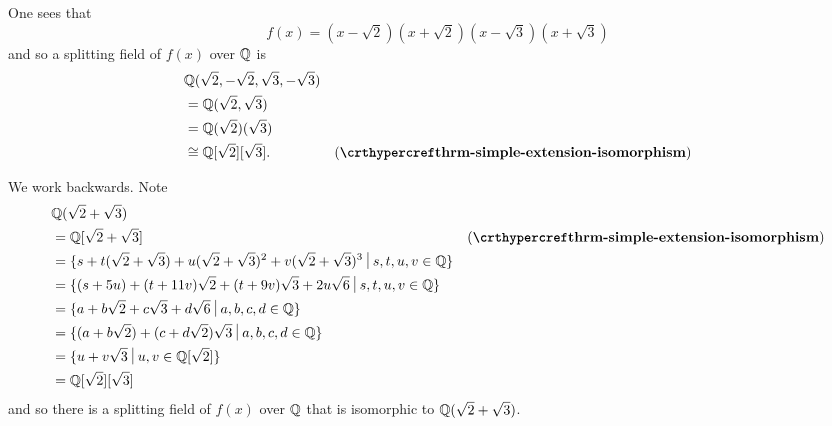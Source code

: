 \begin{questions}
    \item \begin{partquestions}{\roman*}
        \item One sees that
        \[
            f(x) = (x-\sqrt2)(x+\sqrt2)(x-\sqrt3)(x+\sqrt3)
        \]
        and so a splitting field of $f(x)$ over $\mathbb{Q}$ is
        \begin{align*}
            &\Q(\sqrt2, -\sqrt2, \sqrt3, -\sqrt3)\\
            &=\Q(\sqrt2, \sqrt3)\\
            &=\Q(\sqrt2)(\sqrt3)\\
            &\cong \Q[\sqrt2][\sqrt3]. & (\myref{thrm-simple-extension-isomorphism})
        \end{align*}

        \item We work backwards. Note
        \begin{align*}
            &\Q(\sqrt2 + \sqrt3)\\
            &= \Q[\sqrt2 + \sqrt3] & (\myref{thrm-simple-extension-isomorphism})\\
            &= \{s + t(\sqrt2 + \sqrt3) + u(\sqrt2 + \sqrt3)^2 + v(\sqrt2 + \sqrt3)^3 \vert s,t,u,v \in \Q\}\\
            &= \{(s + 5u) + (t + 11v)\sqrt2 + (t + 9v)\sqrt3 + 2u\sqrt6 \vert s, t, u, v \in \Q\}\\
            &= \{a + b\sqrt2 + c\sqrt3 + d\sqrt6 \vert a, b, c, d \in \Q\}\\
            &=\{(a+b\sqrt2) + (c+d\sqrt2)\sqrt3 \vert a, b, c, d \in \Q\}\\
            &=\{u + v\sqrt3 \vert u, v \in \Q[\sqrt2]\}\\
            &= \Q[\sqrt2][\sqrt3]
        \end{align*}
        and so there is a splitting field of $f(x)$ over $\mathbb{Q}$ that is isomorphic to $\mathbb{Q}(\sqrt2 + \sqrt3)$.
    \end{partquestions}
\end{questions}
